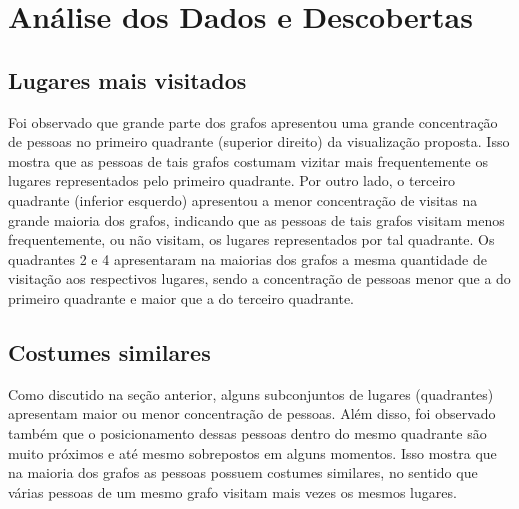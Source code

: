 \documentclass[12pt]{article}
\begin{document}
\section{Análise dos Dados e Descobertas}

\subsection{Lugares mais visitados}

Foi observado que grande parte dos grafos apresentou uma grande concentração de pessoas no primeiro quadrante (superior direito) da visualização proposta. Isso mostra que as pessoas de tais grafos costumam vizitar mais frequentemente os lugares representados pelo primeiro quadrante. Por outro lado, o terceiro quadrante (inferior esquerdo) apresentou a menor concentração de visitas na grande maioria dos grafos, indicando que as pessoas de tais grafos visitam menos frequentemente, ou não visitam, os lugares representados por tal quadrante. Os quadrantes 2 e 4 apresentaram na maiorias dos grafos a mesma quantidade de visitação aos respectivos lugares, sendo a concentração de pessoas menor que a do primeiro quadrante e maior que a do terceiro quadrante.

\subsection{Costumes similares}

Como discutido na seção anterior, alguns subconjuntos de lugares (quadrantes) apresentam maior ou menor concentração de pessoas. Além disso, foi observado também que o posicionamento dessas pessoas dentro do mesmo quadrante são muito próximos e até mesmo sobrepostos em alguns momentos. Isso mostra que na maioria dos grafos as pessoas possuem costumes similares, no sentido que várias pessoas de um mesmo grafo visitam mais vezes os mesmos lugares.


\footnotesize


\end{document}
